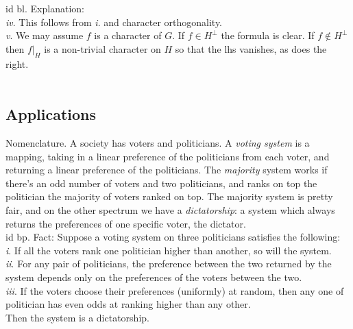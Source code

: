 \documentclass[oneside]{book}
\renewcommand{\i}{{\it i}. }
\newcommand{\ii}{{\it ii}. }
\newcommand{\iii}{{\it iii}. }
\newcommand{\iv}{{\it iv}. }
\renewcommand{\v}{{\it v}. }
\newcommand{\nin}{\not\in}
\begin{document}
id bl. Explanation: \\
\iv This follows from \i and character orthogonality.   \\
\v We may assume $f$ is a character of $G$. If $f\in H^\perp$ the formula is clear. If $f\nin H^\perp$ then $f\rvert_H$ is a non-trivial character on $H$ so that the lhs vanishes, as does the right.  \\\\


\subsection*{Applications}
Nomenclature. A society has voters and politicians. A {\it voting system} is a mapping, taking in a linear preference of the politicians from each voter, and returning a linear preference of the politicians. The {\it majority} system works if there's an odd number of voters and two politicians, and ranks on top the politician the majority of voters ranked on top. The majority system is pretty fair, and on the other spectrum we have a {\it dictatorship}: a system which always returns the preferences of one specific voter, the dictator.    \\


id bp. Fact: Suppose a voting system on three politicians satisfies the following:  \\
\i If all the voters rank one politician higher than another, so will the system.  \\
\ii For any pair of politicians, the preference between the two returned by the system depends only on the preferences of the voters between the two.  \\
\iii If the voters choose their preferences (uniformly) at random, then any one of politician has even odds at ranking higher than any other.  \\
Then the system is a dictatorship.  \\\\
\end{document}

